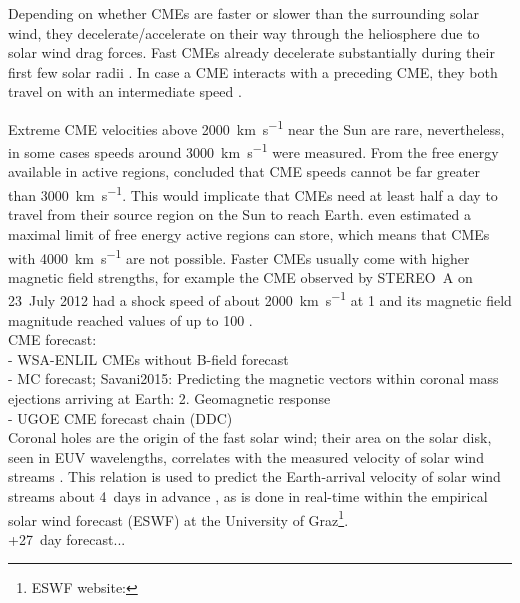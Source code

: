 Depending on whether CMEs are faster or slower than the surrounding solar wind, they decelerate/accelerate on their way through the heliosphere due to solar wind drag forces. Fast CMEs already decelerate substantially during their first few solar radii \citep{Sachdeva2017}. In case a CME interacts with a preceding CME, they both travel on with an intermediate speed \citep{Manoharan2004,Temmer2012}.

Extreme CME velocities above \SI{2000}{\km\per\s} near the Sun are rare, nevertheless, in some cases speeds around \SI{3000}{\km\per\s} were measured. From the free energy available in active regions, \citet{Gopalswamy2005} concluded that CME speeds cannot be far greater than \SI{3000}{\km\per\s}. This would implicate that CMEs need at least half a day to travel from their source region on the Sun to reach Earth. \citet{Gopalswamy2010} even estimated a maximal limit of free energy active regions can store, which means that CMEs with \SI{4000}{\km\per\s} are not possible. Faster CMEs usually come with higher magnetic field strengths, for example the CME observed by STEREO~A on 23~July 2012 had a shock speed of about \SI{2000}{\km\per\s} at \SI{1}{\au} and its magnetic field magnitude reached values of up to \SI{100}{\nT} \citep{Russell2013}.\\





CME forecast:\\
- WSA-ENLIL CMEs without B-field forecast\\
- MC forecast; Savani2015: Predicting the magnetic vectors within coronal mass ejections arriving at Earth: 2. Geomagnetic response\\
- UGOE CME forecast chain (DDC)\\




Coronal holes are the origin of the fast solar wind; their area on the solar disk, seen in EUV wavelengths, correlates with the measured velocity of solar wind streams \citep{Vrsnak2007}. This relation is used to predict the Earth-arrival velocity of solar wind streams about 4~days in advance \citep{Rotter2012}, as is done in real-time within the empirical solar wind forecast (ESWF) at the University of Graz\footnote{ESWF website: }.\\
+27~day forecast...\\

